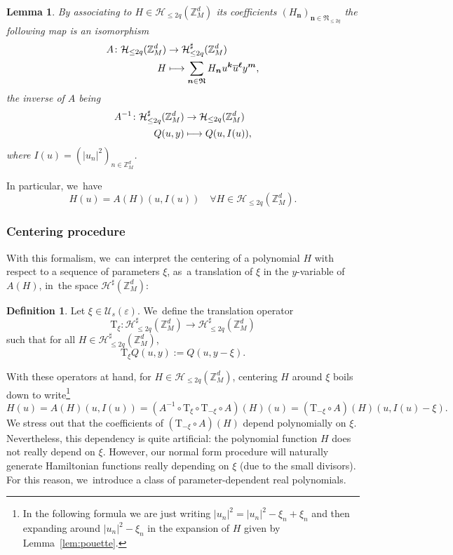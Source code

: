\documentclass[10pt,a4paper]{amsart}
\newcommand\mto{\mathchoice{\longmapsto}{\mapsto}{\mapsto}{\mapsto}}
\theoremstyle{plain}
\newtheorem{lemma}[theorem]{Lemma}
\theoremstyle{definition}
\newtheorem{definition}[theorem]{Definition}
\newcommand{\nb}{{\boldsymbol n}}
\newcommand{\kb}{{\boldsymbol k}}
\newcommand{\lb}{{\boldsymbol \ell}}
\newcommand{\mb}{{\boldsymbol m}}
\newcommand{\Nb}{{\boldsymbol{\mathfrak{N}}}}
\newcommand{\Z}{\mathbb{Z}}
\newcommand{\1}{\mathbf{1}}
\let\epsilon\varepsilon
\begin{document}
\begin{lemma} By associating to $H\in\mathcal{H}_{\leq 2q}(\Z_{M}^{d})$ its coefficients $(H_{\nb})_{\nb\in\Nb_{\leq2q}}$ the following map is an isomorphism
\[
\begin{aligned} A \colon \mathcal{H}_{\leq2q}(\Z_{M}^{d})&\to \mathcal{H}_{\leq2q}^{\sharp}(\Z_{M}^{d}) \\
H &\mto \sum_{\nb\in\Nb} H_{\nb}u^{\kb}\overline{u}^{\lb}y^{\mb},
\end{aligned}
\]
the inverse of $A$ being
\[
\begin{aligned} A^{-1} \colon \mathcal{H}^{\sharp}_{\leq2q}(\Z_{M}^{d})&\to \mathcal{H}_{\leq2q}(\Z_{M}^{d}) \\
Q(u,y) &\mto Q(u,I(u)),
\end{aligned}
\]
where $I(u)=(|u_{n}|^{2})_{n\in\Z_{M}^{d}}$.
\end{lemma}
In particular, we~have
\[
H(u) = A(H)(u,I(u))\quad \forall H\in\mathcal{H}_{\leq2q}(\Z_{M}^{d}).
\]

\subsubsection{Centering procedure}
With this formalism, we~can interpret the centering of a polynomial $H$ with respect to a sequence of parameters $\xi$, as~a translation of $\xi$ in the $y$-variable of $A(H)$, in~the space $\mathcal{H}^{\sharp}(\Z_{M}^{d})$:

\begin{definition} Let $\xi\in\mathcal{U}_{s}(\epsilon)$. We~define the translation operator
\[
\mathrm{T}_{\xi} : \mathcal{H}^{\sharp}_{\leq 2q}(\Z_{M}^{d}) \to\mathcal{H}^{\sharp}_{\leq2q}(\Z_{M}^{d})
\]
such that for all $H\in\mathcal{H}_{\leq2q}^{\sharp}(\Z_{M}^{d})$,
\begin{equation}
\label{eq:tlt}
\mathrm{T}_{\xi}Q(u,y) := Q(u,y-\xi).
\end{equation}
\end{definition}
With these operators at hand, for $H\in\mathcal{H}_{\leq2q}(\Z_{M}^{d})$, centering $H$ around $\xi$ boils down to write\footnote{In the following formula we are just writing $\left|u_{n}\right|^{2}=\left|u_{n}\right|^{2}-\xi_{n}+\xi_{n}$ and then expanding around $\left|u_{n}\right|^{2}-\xi_{n}$ in the expansion of $H$ given by Lemma~\ref{lem:pouette}.}
\begin{equation}
\label{eq:12}
H(u) = A(H)(u,I(u))
= (A^{-1}\circ\mathrm{T}_{\xi}\circ\mathrm{T}_{-\xi}\circ A)(H)(u)
= (\mathrm{T}_{-\xi}\circ A)(H)(u,I(u)-\xi).
\end{equation}
We stress out that the coefficients of $(\mathrm{T}_{-\xi}\circ A)(H)$ depend polynomially on $\xi$. Nevertheless, this dependency is quite artificial: the polynomial function $H$ does not really depend on $\xi$. However, our normal form procedure will naturally generate Hamiltonian functions really depending on $\xi$ (due to the small divisors). For this reason, we~introduce a class of parameter-dependent real polynomials.
\end{document}
